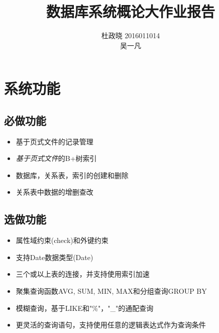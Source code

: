 \documentclass[11pt,UTF8]{report}
\title{数据库系统概论大作业报告}
\author{杜政晓 2016011014\\
吴一凡 }
\begin{document}
\maketitle

\section{系统功能}
\subsection{必做功能}
\begin{itemize}
	\item 基于页式文件的记录管理
	\item \emph{基于页式文件}的B+树索引
	\item 数据库，关系表，索引的创建和删除
	\item 关系表中数据的增删查改
\end{itemize}

\subsection{选做功能}
\begin{itemize}
	\item 属性域约束(check)和外键约束
	\item 支持Date数据类型(Date)
	\item 三个或以上表的连接，并支持使用索引加速
	\item 聚集查询函数AVG, SUM, MIN, MAX和分组查询GROUP BY
	\item 模糊查询，基于LIKE和"\%"，"\_"的通配查询
	\item 更灵活的查询语句，支持使用任意的逻辑表达式作为查询条件
\end{itemize}
\end{document}
